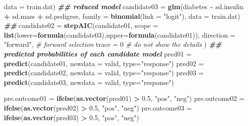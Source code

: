 \documentclass[
]{book}
\newenvironment{Shaded}{\begin{snugshade}}{\end{snugshade}}
\newcommand{\AttributeTok}[1]{\textcolor[rgb]{0.13,0.29,0.53}{#1}}
\newcommand{\CommentTok}[1]{\textcolor[rgb]{0.56,0.35,0.01}{\textit{#1}}}
\newcommand{\DecValTok}[1]{\textcolor[rgb]{0.00,0.00,0.81}{#1}}
\newcommand{\DocumentationTok}[1]{\textcolor[rgb]{0.56,0.35,0.01}{\textbf{\textit{#1}}}}
\newcommand{\FloatTok}[1]{\textcolor[rgb]{0.00,0.00,0.81}{#1}}
\newcommand{\FunctionTok}[1]{\textcolor[rgb]{0.13,0.29,0.53}{\textbf{#1}}}
\newcommand{\NormalTok}[1]{#1}
\newcommand{\OtherTok}[1]{\textcolor[rgb]{0.56,0.35,0.01}{#1}}
\newcommand{\SpecialCharTok}[1]{\textcolor[rgb]{0.81,0.36,0.00}{\textbf{#1}}}
\newcommand{\StringTok}[1]{\textcolor[rgb]{0.31,0.60,0.02}{#1}}
\begin{document}
\begin{Shaded}
\begin{Highlighting}[]
                    \AttributeTok{data =}\NormalTok{ train.dat)  }
\DocumentationTok{\#\# reduced model}
\NormalTok{  candidate03 }\OtherTok{=} \FunctionTok{glm}\NormalTok{(diabetes }\SpecialCharTok{\textasciitilde{}}\NormalTok{ sd.insulin }\SpecialCharTok{+}\NormalTok{ sd.mass }\SpecialCharTok{+}\NormalTok{ sd.pedigree, }
                    \AttributeTok{family =} \FunctionTok{binomial}\NormalTok{(}\AttributeTok{link =} \StringTok{"logit"}\NormalTok{),  }
                    \AttributeTok{data =}\NormalTok{ train.dat) }
\DocumentationTok{\#\# }
\NormalTok{   candidate02 }\OtherTok{=} \FunctionTok{stepAIC}\NormalTok{(candidate01, }
                      \AttributeTok{scope =} \FunctionTok{list}\NormalTok{(}\AttributeTok{lower=}\FunctionTok{formula}\NormalTok{(candidate03),}\AttributeTok{upper=}\FunctionTok{formula}\NormalTok{(candidate01)),}
                      \AttributeTok{direction =} \StringTok{"forward"}\NormalTok{,   }\CommentTok{\# forward selection}
                      \AttributeTok{trace =} \DecValTok{0}                \CommentTok{\# do not show the details}
\NormalTok{                      )}
  \DocumentationTok{\#\#  predicted probabilities of each candidate model}
\NormalTok{   pred01 }\OtherTok{=} \FunctionTok{predict}\NormalTok{(candidate01, }\AttributeTok{newdata =}\NormalTok{ valid, }\AttributeTok{type=}\StringTok{"response"}\NormalTok{)}
\NormalTok{   pred02 }\OtherTok{=} \FunctionTok{predict}\NormalTok{(candidate02, }\AttributeTok{newdata =}\NormalTok{ valid, }\AttributeTok{type=}\StringTok{"response"}\NormalTok{)}
\NormalTok{   pred03 }\OtherTok{=} \FunctionTok{predict}\NormalTok{(candidate03, }\AttributeTok{newdata =}\NormalTok{ valid, }\AttributeTok{type=}\StringTok{"response"}\NormalTok{)}
   
\NormalTok{   pre.outcome01 }\OtherTok{=} \FunctionTok{ifelse}\NormalTok{(}\FunctionTok{as.vector}\NormalTok{(pred01) }\SpecialCharTok{\textgreater{}} \FloatTok{0.5}\NormalTok{, }\StringTok{"pos"}\NormalTok{, }\StringTok{"neg"}\NormalTok{)}
\NormalTok{   pre.outcome02 }\OtherTok{=} \FunctionTok{ifelse}\NormalTok{(}\FunctionTok{as.vector}\NormalTok{(pred02) }\SpecialCharTok{\textgreater{}} \FloatTok{0.5}\NormalTok{, }\StringTok{"pos"}\NormalTok{, }\StringTok{"neg"}\NormalTok{)}
\NormalTok{   pre.outcome03 }\OtherTok{=} \FunctionTok{ifelse}\NormalTok{(}\FunctionTok{as.vector}\NormalTok{(pred03) }\SpecialCharTok{\textgreater{}} \FloatTok{0.5}\NormalTok{, }\StringTok{"pos"}\NormalTok{, }\StringTok{"neg"}\NormalTok{)}
   

\end{Highlighting}
\end{Shaded}
\end{document}
